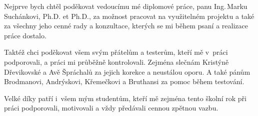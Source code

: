 \documentclass[czech,master,unicode]{ctufit-thesis}
\begin{document}
 
\frontmatter\frontmatterinit %
\thispagestyle{empty}\maketitle\thispagestyle{empty}\cleardoublepage %


\imprintpage %
\stopTOCentries

\begin{acknowledgmentpage}
    Nejprve bych chtěl poděkovat vedoucímu mé diplomové práce, panu Ing.\,Marku Suchánkovi, Ph.D. et Ph.D., za možnost pracovat na využitelném projektu a také za všechny jeho cenné rady a konzultace, kterých se mi během psaní a realizace práce dostalo.

    \vspace{1em}
    
    Taktéž chci poděkovat všem svým přátelům a testerům, kteří mě v~práci podporovali, a práci mi průběžně kontrolovali. Zejména slečnám Kristýně Dřevikovské a Avě Špráchalů
    za jejich korekce a neustálou oporu. A také pánům
    Brodmanovi,
    Andrýskovi,
    Křemečkovi
    a
    Bruthansi 
    za pomoc během testování.

    \vspace{1em}

    Velké díky patří i~všem mým studentům, kteří mě zejména tento školní rok při práci podporovali, motivovali a vždy předávali cennou zpětnou vazbu. 
\end{acknowledgmentpage} 
\end{document}
